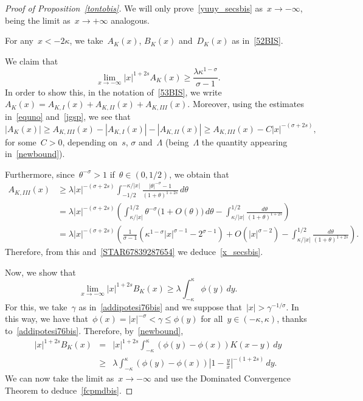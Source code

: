 \documentclass[10pt,a4paper]{amsart}
\numberwithin{equation}{section}
\begin{document}
\begin{proof}[Proof of Proposition~\ref{tontobis}]
We will only prove~\eqref{yuuy_secsbis} as~$x \to -\infty$, being
the limit as~$x\to +\infty$ analogous.

For any~$x<-2\kappa$, we take~$A_K(x)$, $B_K(x)$ and~$D_K(x)$ as in~\eqref{52BIS}.

We claim that 
\begin{equation}\label{x_secsbis}
\lim_{x \to -\infty} |x |^{1+2s} A_K(x) \geq  \frac{\lambda\kappa^{1-\sigma}}{\sigma-1}.
\end{equation}
In order to show this, in the notation of~\eqref{53BIS},
we write~$A_K(x)= A_{K,I}(x)+A_{K,II}(x)+A_{K,III}(x)$.
Moreover, using the estimates in~\eqref{equno} and~\eqref{jgsp}, we see that
\begin{equation}\label{STAR67839287654}
|A_K(x)|\ge A_{K,III}(x)-|A_{K,I}(x)|-|A_{K,II}(x)|\ge  A_{K,III}(x)-C | x |^{-(\sigma+2s)},
\end{equation}
for some~$C>0$, depending on~$s$, $\sigma$ and~$\Lambda$ (being~$\Lambda$ the quantity appearing in~\eqref{newbound}).

Furthermore, since~$\theta^{-\sigma}>1$ if~$\theta \in (0,1/2)$, we obtain that
\begin{equation*}
\begin{split}
A_{K,III}(x) & \geq \lambda |x |^{-(\sigma+2s)} 
\int_{-{1}/{2}}^{-{\kappa}/{|x|}} \frac{ |\theta|^{-\sigma}-1}{ (1+\theta)^{1+2s}} \, d\theta\\
&= \lambda | x |^{-(\sigma+2s)} 
\left(
\int_{{\kappa}/{|x |}}^{{1}/{2}} 
\theta^{-\sigma}\big(1+O(\theta)\big) \, d\theta -
\int_{{\kappa}/{|x |}}^{{1}/{2}} \frac{d\theta}{(1+\theta)^{1+2s}}\right)\\
&= \lambda |x |^{-(\sigma+2s)} 
\left( \frac{1}{\sigma-1}\left( \kappa^{1-\sigma}|x|^{\sigma-1}-2^{\sigma-1} \right) +O(|x|^{\sigma-2})
-\int_{{\kappa}/{|x |}}^{{1}/{2}} \frac{d\theta}{(1+\theta)^{1+2s}}\right).
\end{split}
\end{equation*}
Therefore, from this and~\eqref{STAR67839287654} we deduce~\eqref{x_secsbis}.
 
Now, we show that
\begin{equation}\label{fcpmdbis}
\lim_{x \to - \infty} |x |^{1+2s} B_K(x) \geq  \lambda \int_{-\kappa}^{\kappa} \phi(y)\, dy.
\end{equation}
For this, we take~$\gamma$ as in~\eqref{addipotesi76bis}
and we suppose that~$|x|>\gamma^{-1/\sigma}$.
In this way, we have that~$\phi(x)=|x|^{-\sigma}<\gamma\le\phi(y)$
for all~$y\in(-\kappa,\kappa)$,
thanks to~\eqref{addipotesi76bis}.
Therefore, by~\eqref{newbound},
\begin{eqnarray*}
|x|^{1+2s}B_K(x)&=& |x|^{1+2s}
\int_{-\kappa}^{\kappa} \left( \phi(y) -\phi(x)\right) K(x-y) \, dy\\
&\geq& \lambda \int_{-\kappa}^{\kappa} \left( \phi(y)-\phi(x) \right) \left| 1 -\frac{y}{x} \right|^{-(1+2s)}\, dy.
\end{eqnarray*}
We can now take the limit as~$x\to-\infty$ and use the
Dominated Convergence Theorem to deduce~\eqref{fcpmdbis}.


\end{proof}
\end{document}
